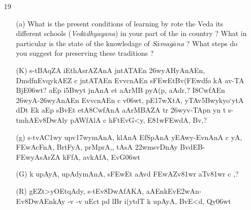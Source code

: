 {\begin{itemize}
  \item[19] \begin{itemize}
            
            \item[(a)] What is the present conditions of learning by rote the Veda its different schools ({\textit {Ved$\bar{a}$dhyayana}}) in your part of the in country ? What in particular is the state of the knowledage of {\textit {S$\bar{a}$mag$\bar{a}$na}} ? What steps do you suggest for preserving these traditions ?
\end{itemize}
\end{itemize}
}

\begin{itemize} 
\item[]		 \begin{itemize}               
                \item[({\dn K})] {\dn s\2-tBAqZA iEthAsrAZAnA\2 jntATA\0En \326wyAHyAnAEn{\rs ,\re} Dm\0df\0nEvqykAEZ c jntATA\0En Evv\?cnAEn s\2\3FEwEt\break Bv(\3FEwd\?fo kA av-TA\2 BjE\306wt{\rs ?\re} aEp i\35Bwyt\? jnAnA et\? aArMB\? pyA\0(p, aAdr,{\rs ?\re} I\38CwfAEn \326wyA-\326wyAnAEn Evv\?cnAEn c v\0\306wt, pE\317wXtA, yTAv\35Bwykyo`ytA\2 dDt\? Ek aEp s\2BvEt etA\38CwfAnA aArMBAZA\2 tr\2 \326wyv-TApn y\?n t\? s\2-tmhAEv\38DwAly\? pAWfAlA c hFtEvG\?<y, E\381w\3FEwdA, Bv\?,{\rs ?\re}}
                
                \item[({\dn g})] {\dn s\2-tvA\3C1wy\? upv\317wy\0mAnA, klAnA\2{\rs ,\re} EfSpAnA\2{\rs ,\re} y\3EAwy{\rs -\re}\-EvnAnA\2 c yA, \3FEwAcFnA, BrtFyA, prMprA,{\rs ,\re} tAsA\2 \322w\?ms\2vD\0nAy BvdEB{\rs -\re}\3FEwyAsAr\?ZA kFfA, avkAfA, EvG\306wt} 
                
                \item[({\dn G})] {\dn k\? upAyA, upAd\?ymAnA, s\2\3FEwEt aAv\?{\qvb}d\2 \3FEwAZv\381wr aT{\rdt}v\381wr\2 c \0,{\rs ?\re}}
                
                \item[({\dn R})] {\dn gEZt>yOEtqAdy, s\2-tEv\38DwAfAKA, aAEnk\-Ev\3E2wAn{\rs -\re}\-Ev\38DwAEnkAy\? -v\2 -v uEct\2 pd\2 lB\?r i(y\?tdT\?{\qvb} k\? upAyA, BvE<d, Qy\306wt}
               \end{itemize} 
               

\end{itemize}
